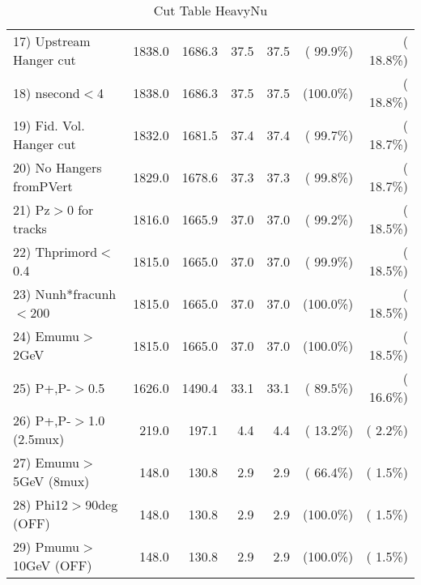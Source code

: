 \begin{table}[h!]
\begin{tabular}{||l||r|r|r|r|r|r||}
 17) Upstream Hanger cut  &       1838.0 &       1686.3 &         37.5 &         37.5 & ( 99.9\%) & ( 18.8\%) \\
 18) nsecond$<$4          &       1838.0 &       1686.3 &         37.5 &         37.5 & (100.0\%) & ( 18.8\%) \\
 19) Fid. Vol. Hanger cut &       1832.0 &       1681.5 &         37.4 &         37.4 & ( 99.7\%) & ( 18.7\%) \\
 20) No Hangers fromPVert &       1829.0 &       1678.6 &         37.3 &         37.3 & ( 99.8\%) & ( 18.7\%) \\
 21) Pz$>$0 for tracks    &       1816.0 &       1665.9 &         37.0 &         37.0 & ( 99.2\%) & ( 18.5\%) \\
 22) Thprimord$<$0.4      &       1815.0 &       1665.0 &         37.0 &         37.0 & ( 99.9\%) & ( 18.5\%) \\
 23) Nunh*fracunh$<$200   &       1815.0 &       1665.0 &         37.0 &         37.0 & (100.0\%) & ( 18.5\%) \\
 24) Emumu$>$2GeV         &       1815.0 &       1665.0 &         37.0 &         37.0 & (100.0\%) & ( 18.5\%) \\
 25) P+,P-$>$0.5          &       1626.0 &       1490.4 &         33.1 &         33.1 & ( 89.5\%) & ( 16.6\%) \\
 26) P+,P-$>$1.0 (2.5mux) &        219.0 &        197.1 &          4.4 &          4.4 & ( 13.2\%) & (  2.2\%) \\
 27) Emumu$>$5GeV  (8mux) &        148.0 &        130.8 &          2.9 &          2.9 & ( 66.4\%) & (  1.5\%) \\
 28) Phi12$>$90deg  (OFF) &        148.0 &        130.8 &          2.9 &          2.9 & (100.0\%) & (  1.5\%) \\
 29) Pmumu$>$10GeV  (OFF) &        148.0 &        130.8 &          2.9 &          2.9 & (100.0\%) & (  1.5\%) \\
 \hline
 \hline
 \end{tabular}
 \caption{Cut Table  HeavyNu  }
 \label{tab-cutheavy_neutrino}
 \end{table}
